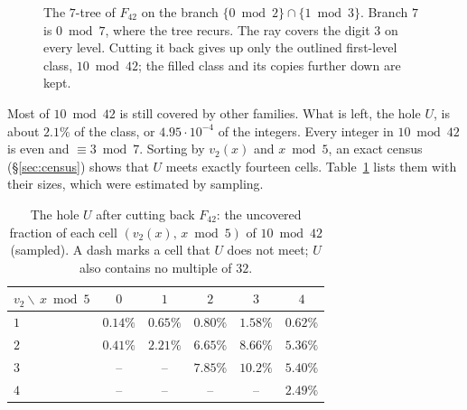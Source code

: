 \documentclass[11pt]{amsart}
\theoremstyle{definition}
\theoremstyle{remark}
\begin{document}
\begin{figure}[ht]
\centering
{}
\caption{The $7$-tree of $F_{42}$ on the branch $\{0 \bmod 2\}\cap\{1 \bmod 3\}$. Branch $7$ is $0 \bmod 7$, where the
tree recurs. The ray covers the digit $3$ on every level. Cutting it back gives up only the outlined first-level
class, $10 \bmod 42$; the filled class and its copies further down are kept.}\label{fig:cut}
\end{figure}

Most of $10 \bmod 42$ is still covered by other families. What is left, the hole $U$, is about $2.1\%$ of the class,
or $4.95\cdot10^{-4}$ of the integers. Every integer in $10 \bmod 42$ is even and $\equiv 3 \bmod 7$. Sorting by
$v_2(x)$ and $x \bmod 5$, an exact census (§\ref{sec:census}) shows that $U$ meets exactly fourteen cells.
Table~\ref{tab:hole} lists them with their sizes, which were estimated by sampling.

\begin{table}[ht]
\centering
\caption{The hole $U$ after cutting back $F_{42}$: the uncovered fraction of each cell $(v_2(x),\,x \bmod 5)$ of
$10 \bmod 42$ (sampled). A dash marks a cell that $U$ does not meet; $U$ also contains no multiple of $32$.}\label{tab:hole}
\begin{tabular}{@{}lccccc@{}}
\toprule
$v_2 \backslash\, x \bmod 5$ & $0$ & $1$ & $2$ & $3$ & $4$\\
\midrule
$1$ & $0.14\%$ & $0.65\%$ & $0.80\%$ & $1.58\%$ & $0.62\%$\\
$2$ & $0.41\%$ & $2.21\%$ & $6.65\%$ & $8.66\%$ & $5.36\%$\\
$3$ & -- & -- & $7.85\%$ & $10.2\%$ & $5.40\%$\\
$4$ & -- & -- & -- & -- & $2.49\%$\\
\bottomrule
\end{tabular}
\end{table}
\end{document}
